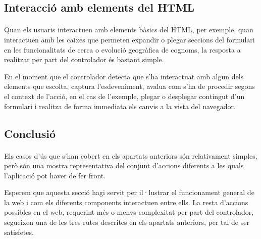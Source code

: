     \subsection{Interacció amb elements del HTML}

    \paragraph{}
    Quan els usuaris interactuen amb elements bàsics del HTML, per exemple, quan interactuen amb les caixes que permeten expandir o plegar seccions del formulari en les funcionalitats de cerca o evolució geogràfica de cognoms, la resposta a realitzar per part del controlador és bastant simple.

    En el moment que el controlador detecta que s'ha interactuat amb algun dels elements que escolta, captura l'esdeveniment, avalua com s'ha de procedir segons el context de l'acció, en el cas de l’exemple, plegar o desplegar contingut d'un formulari i realitza de forma immediata els canvis a la vista del navegador.


    \subsection{Conclusió}

    \paragraph{}
    Els casos d'ús que s'han cobert en els apartats anteriors són relativament simples, però són una mostra representativa del conjunt d'accions diferents a les quals l'aplicació pot haver de fer front.

    Esperem que aquesta secció hagi servit per il·lustrar el funcionament general de la web i com els diferents components interactuen entre ells. La resta d’accions possibles en el web, requerint més o menys complexitat per part del controlador, segueixen una de les tres rutes descrites en els apartats anteriors, per tal de ser satisfetes.
